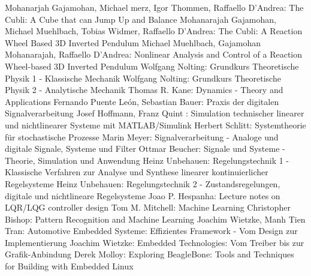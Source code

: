 \documentclass{article}
\begin{document}
\newpage
\begin{thebibliography}{\hspace{0.5cm}}
	 Mohanarjah Gajamohan, Michael merz, Igor Thommen, Raffaello D'Andrea: The Cubli: A Cube that can Jump Up and Balance
	 Mohanarajah Gajamohan, Michael Muehlbach, Tobias Widmer, Raffaello D'Andrea: The Cubli: A Reaction Wheel Based 3D Inverted Pendulum
	 Michael Muehlbach, Gajamohan Mohanarajah, Raffaello D'Andrea: Nonlinear Analysis and Control of a Reaction Wheel-based 3D Inverted Pendulum
	 Wolfgang Nolting: Grundkurs Theoretische Physik 1 - Klassische Mechanik
	 Wolfgang Nolting: Grundkurs Theoretische Physik 2 - Analytische Mechanik
	 Thomas R. Kane: Dynamics - Theory and Applications
	 Fernando Puente Le\'on, Sebastian Bauer: Praxis der digitalen Signalverarbeitung
	 Josef Hoffmann, Franz Quint : Simulation technischer linearer und nichtlinearer Systeme mit MATLAB/Simulink
	 Herbert Schlitt: Systemtheorie für stochastische Prozesse
	 Marin Meyer: Signalverarbeitung - Analoge und digitale Signale, Systeme und Filter
	 Ottmar Beucher: Signale und Systeme - Theorie, Simulation und Anwendung
	 Heinz Unbehauen: Regelungstechnik 1 - Klassische Verfahren zur Analyse und Synthese linearer kontinuierlicher Regelsysteme
	 Heinz Unbehauen: Regelungstechnik 2 - Zustandsregelungen, digitale und nichtlineare Regelsysteme
	 Joao P. Hespanha: Lecture notes on LQR/LQG controller design
	 Tom M. Mitchell: Machine Learning
	 Christopher Bishop: Pattern Recognition and Machine Learning
	 Joachim Wietzke, Manh Tien Tran: Automotive Embedded Systeme: Effizientes Framework - Vom Design zur Implementierung
	 Joachim Wietzke: Embedded Technologies: Vom Treiber bis zur Grafik-Anbindung
	 Derek Molloy: Exploring BeagleBone: Tools and Techniques for Building with Embedded Linux
\end{thebibliography}
\end{document}
